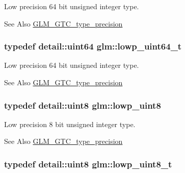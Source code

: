 Low precision 64 bit unsigned integer type. \begin{DoxySeeAlso}{See Also}
\hyperlink{group__gtc__type__precision}{G\-L\-M\-\_\-\-G\-T\-C\-\_\-type\-\_\-precision} 
\end{DoxySeeAlso}
\hypertarget{group__gtc__type__precision_gabf3069d4f188557a87b1d7f35eb0a270}{
\subsubsection[{lowp\-\_\-uint64\-\_\-t}]{\setlength{\rightskip}{0pt plus 5cm}typedef detail\-::uint64 {\bf glm\-::lowp\-\_\-uint64\-\_\-t}}}\label{group__gtc__type__precision_gabf3069d4f188557a87b1d7f35eb0a270}
Low precision 64 bit unsigned integer type. \begin{DoxySeeAlso}{See Also}
\hyperlink{group__gtc__type__precision}{G\-L\-M\-\_\-\-G\-T\-C\-\_\-type\-\_\-precision} 
\end{DoxySeeAlso}
\hypertarget{group__gtc__type__precision_ga4d9dc08b7b248a386dfe9afd00fc6b1e}{
\subsubsection[{lowp\-\_\-uint8}]{\setlength{\rightskip}{0pt plus 5cm}typedef detail\-::uint8 {\bf glm\-::lowp\-\_\-uint8}}}\label{group__gtc__type__precision_ga4d9dc08b7b248a386dfe9afd00fc6b1e}
Low precision 8 bit unsigned integer type. \begin{DoxySeeAlso}{See Also}
\hyperlink{group__gtc__type__precision}{G\-L\-M\-\_\-\-G\-T\-C\-\_\-type\-\_\-precision} 
\end{DoxySeeAlso}
\hypertarget{group__gtc__type__precision_ga0910ef24195d1b8b26e34d73148c0c45}{
\subsubsection[{lowp\-\_\-uint8\-\_\-t}]{\setlength{\rightskip}{0pt plus 5cm}typedef detail\-::uint8 {\bf glm\-::lowp\-\_\-uint8\-\_\-t}}}\label{group__gtc__type__precision_ga0910ef24195d1b8b26e34d73148c0c45}
